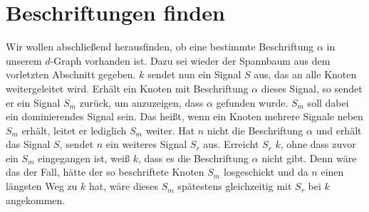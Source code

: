 \documentclass[11pt]{article}
\begin{document}
\section{Beschriftungen finden}

Wir wollen abschließend herausfinden, ob eine bestimmte Beschriftung $\alpha$ in unserem $d$-Graph vorhanden ist. Dazu sei wieder der Spannbaum aus dem vorletzten Abschnitt gegeben. $k$ sendet nun ein Signal $S$ aus, das an alle Knoten weitergeleitet wird. Erhält ein Knoten mit Beschriftung $\alpha$ dieses Signal, so sendet er ein Signal $S_m$ zurück, um anzuzeigen, dass $\alpha$ gefunden wurde. $S_m$ soll dabei ein dominierendes Signal sein. Das heißt, wenn ein Knoten mehrere Signale neben $S_m$ erhält, leitet er lediglich $S_m$ weiter. Hat $n$ nicht die Beschriftung $\alpha$ und erhält das Signal $S$, sendet $n$ ein weiteres Signal $S_r$ aus. Erreicht $S_r$ $k$, ohne dass zuvor ein $S_m$ eingegangen ist, weiß $k$, dass es die Beschriftung $\alpha$ nicht gibt. Denn wäre das der Fall, hätte der so beschriftete Knoten $S_m$ losgeschickt und da $n$ einen längsten Weg zu $k$ hat, wäre dieses $S_m$ spätestens gleichzeitig mit $S_r$ bei $k$ angekommen.
\printbibliography
\end{document}
